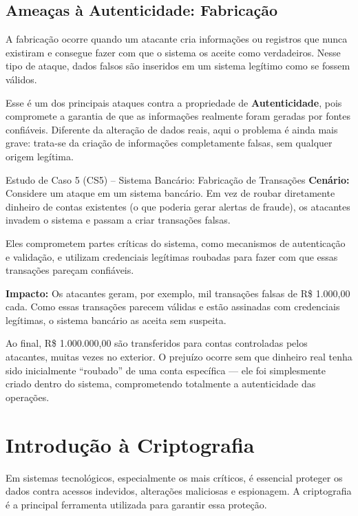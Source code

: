\documentclass[12pt,a4paper,twoside]{report}
\begin{document}
\subsection{Ameaças à Autenticidade: Fabricação}
A fabricação ocorre quando um atacante cria informações ou registros que nunca existiram e consegue fazer com que o sistema os aceite como verdadeiros. Nesse tipo de ataque, dados falsos são inseridos em um sistema legítimo como se fossem válidos.

Esse é um dos principais ataques contra a propriedade de \textbf{Autenticidade}, pois compromete a garantia de que as informações realmente foram geradas por fontes confiáveis. Diferente da alteração de dados reais, aqui o problema é ainda mais grave: trata-se da criação de informações completamente falsas, sem qualquer origem legítima.

\begin{block}{Estudo de Caso 5 (CS5) – Sistema Bancário: Fabricação de Transações}
\textbf{Cenário:} Considere um ataque em um sistema bancário. Em vez de roubar diretamente dinheiro de contas existentes (o que poderia gerar alertas de fraude), os atacantes invadem o sistema e passam a criar transações falsas.

Eles comprometem partes críticas do sistema, como mecanismos de autenticação e validação, e utilizam credenciais legítimas roubadas para fazer com que essas transações pareçam confiáveis.

\textbf{Impacto:} Os atacantes geram, por exemplo, mil transações falsas de R\$ 1.000,00 cada. Como essas transações parecem válidas e estão assinadas com credenciais legítimas, o sistema bancário as aceita sem suspeita.

Ao final, R\$ 1.000.000,00 são transferidos para contas controladas pelos atacantes, muitas vezes no exterior. O prejuízo ocorre sem que dinheiro real tenha sido inicialmente “roubado” de uma conta específica — ele foi simplesmente criado dentro do sistema, comprometendo totalmente a autenticidade das operações.
\end{block}

\section{Introdução à Criptografia}

Em sistemas tecnológicos, especialmente os mais críticos, é essencial proteger os dados contra acessos indevidos, alterações maliciosas e espionagem. A criptografia é a principal ferramenta utilizada para garantir essa proteção.
\end{document}
